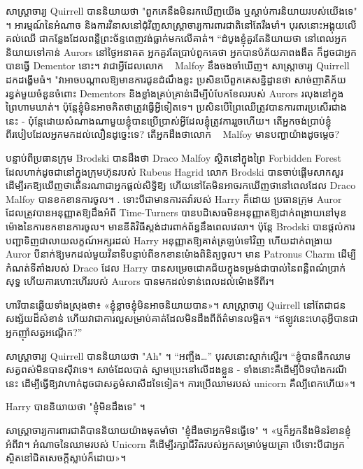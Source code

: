 សាស្ត្រាចារ្យ Quirrell បាននិយាយថា "ពួកគេនឹងមិនរកឃើញយើង ឬស្តាប់ការនិយាយរបស់យើងទេ" ។ អារម្មណ៍នៃអំណាច និងការវិនាសនៅជុំវិញសាស្រ្តាចារ្យការពារជាតិនៅតែរឹងមាំ។ បុរស​នោះ​អង្គុយ​លើ​គល់​ឈើ ជា​កន្លែង​ដែល​ពន្លឺ​ព្រះច័ន្ទ​ពេញ​វង់​ធ្លាក់​មក​លើ​គាត់។ “ដំបូងខ្ញុំគួរតែនិយាយថា នៅពេលអ្នកនិយាយទៅកាន់ Aurors នៅថ្ងៃអនាគត អ្នកគួរតែប្រាប់ពួកគេថា អ្នកបានបំភ័យភាពងងឹត ក៏ដូចជាអ្នកបានធ្វើ Dementor នោះ។ វាជាអ្វីដែលលោក ~ Malfoy នឹងចងចាំឃើញ។ សាស្ត្រាចារ្យ Quirrell ដកដង្ហើមធំ។ "វាអាចបណ្តាលឱ្យមានការជូនដំណឹងខ្លះ ប្រសិនបើពួកគេសន្និដ្ឋានថា សាច់ញាតិភ័យរន្ធត់មួយចំនួនចំពោះ Dementors និងខ្លាំងគ្រប់គ្រាន់ដើម្បីបំបែកខែលរបស់ Aurors រលុងនៅក្នុងព្រៃហាមឃាត់។ ប៉ុន្តែ​ខ្ញុំ​មិន​អាច​គិត​ថា​ត្រូវ​ធ្វើ​អ្វី​ទៀត​ទេ។ ប្រសិនបើព្រៃឈើត្រូវបានការពារប្រសើរជាងនេះ - ប៉ុន្តែដោយសំណាងណាមួយខ្ញុំបានប្រើប្រាស់អ្វីដែលខ្ញុំត្រូវការរួចហើយ។ តើអ្នកចង់ប្រាប់ខ្ញុំពីរបៀបដែលអ្នកមកដល់លឿនដូច្នេះទេ? តើអ្នកដឹងថាលោក ~ Malfoy មានបញ្ហាយ៉ាងដូចម្តេច?

បន្ទាប់ពីប្រធានក្រុម Brodski បានដឹងថា Draco Malfoy ស្ថិតនៅក្នុងព្រៃ Forbidden Forest ដែលហាក់ដូចជានៅក្នុងក្រុមហ៊ុនរបស់ Rubeus Hagrid លោក Brodski បានចាប់ផ្តើមសាកសួរដើម្បីរកឱ្យឃើញថាតើនរណាជាអ្នកផ្តល់សិទ្ធិឱ្យ ហើយនៅតែមិនអាចរកឃើញថានៅពេលដែល Draco Malfoy បានខកខានការចូល។ . ទោះបីជាមានការតវ៉ារបស់ Harry ក៏ដោយ ប្រធានក្រុម Auror ដែលត្រូវបានអនុញ្ញាតឱ្យដឹងអំពី Time-Turners បានបដិសេធមិនអនុញ្ញាតឱ្យដាក់ពង្រាយនៅមុនម៉ោងនៃការខកខានការចូល។ មាននីតិវិធីស្តង់ដារពាក់ព័ន្ធនឹងពេលវេលា។ ប៉ុន្តែ Brodski បានផ្តល់ការបញ្ជាទិញជាលាយលក្ខណ៍អក្សរដល់ Harry អនុញ្ញាតឱ្យគាត់ត្រឡប់ទៅវិញ ហើយដាក់ពង្រាយ Auror បីនាក់ឱ្យមកដល់មួយវិនាទីបន្ទាប់ពីខកខានម៉ោងពិនិត្យចូល។ មាន Patronus Charm ដើម្បីកំណត់ទីតាំងរបស់ Draco ដែល Harry បានសម្រេចជោគជ័យក្នុងទម្រង់ជាបាល់នៃពន្លឺពណ៌ប្រាក់សុទ្ធ ហើយការហោះហើររបស់ Aurors បានមកដល់ទាន់ពេលដល់ម៉ោងទីពីរ។

ហារី​បាន​ឆ្លើយ​ទាំង​ស្រុង​ថា៖ «ខ្ញុំ​ខ្លាច​ខ្ញុំ​មិន​អាច​និយាយ​បាន»។ សាស្ត្រាចារ្យ Quirrell នៅតែជាជនសង្ស័យដ៏សំខាន់ ហើយវាជាការល្អសម្រាប់គាត់ដែលមិនដឹងពីព័ត៌មានលម្អិត។ “ឥឡូវ​នេះ​ហេតុ​អ្វី​បាន​ជា​អ្នក​ញ៉ាំ​សត្វ​អណ្តើក?”

សាស្រ្តាចារ្យ Quirrell បាននិយាយថា "Ah" ។ “អញ្ចឹង…” បុរសនោះស្ទាក់ស្ទើរ។ “ខ្ញុំ​បាន​ផឹក​ឈាម​សត្វ​ពស់​មិន​បាន​ស៊ី​វា​ទេ។ សាច់ដែលបាត់ ស្នាមប្រេះនៅលើដងខ្លួន - ទាំងនោះគឺដើម្បីបិទបាំងករណីនេះ ដើម្បីធ្វើឱ្យវាហាក់ដូចជាសត្វមំសាសីដទៃទៀត។ ការ​ប្រើ​ឈាម​របស់ unicorn គឺ​ល្បី​ពេក​ហើយ»។

Harry បាននិយាយថា "ខ្ញុំមិនដឹងទេ" ។

សាស្ត្រាចារ្យការពារជាតិបាននិយាយយ៉ាងមុតមាំថា "ខ្ញុំដឹងថាអ្នកមិនធ្វើទេ" ។ «ឬ​ក៏​អ្នក​នឹង​មិន​រំខាន​ខ្ញុំ​អំពី​វា​។ អំណាចនៃឈាមរបស់ Unicorn គឺដើម្បីរក្សាជីវិតរបស់អ្នកសម្រាប់មួយគ្រា បើទោះបីជាអ្នកស្ថិតនៅជិតសេចក្តីស្លាប់ក៏ដោយ»។

